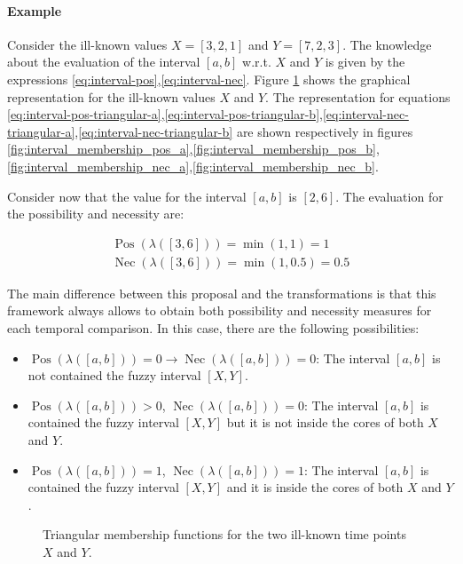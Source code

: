 \documentclass[twoside,twocolumn,a4paper]{article}
\newcommand{\Pos}{\operatorname{Pos}}
\newcommand{\Nec}{\operatorname{Nec}}
\begin{document}
\paragraph{Example} Consider the ill-known values $X = \left[3, 2, 1\right]$ and $Y = \left[7, 2, 3 \right]$. The knowledge about the evaluation of the interval $\left[a, b \right]$ w.r.t. $X$ and $Y$ is given by the expressions \eqref{eq:interval-pos},\eqref{eq:interval-nec}.  Figure \ref{fig:interval-rep} shows the graphical representation for the ill-known values $X$ and $Y$. The representation for equations \eqref{eq:interval-pos-triangular-a},\eqref{eq:interval-pos-triangular-b},\eqref{eq:interval-nec-triangular-a},\eqref{eq:interval-nec-triangular-b} are shown respectively in figures \ref{fig:interval_membership_pos_a},\ref{fig:interval_membership_pos_b},\ref{fig:interval_membership_nec_a},\ref{fig:interval_membership_nec_b}.

Consider now that the value for the interval $\left[a, b \right]$ is $\left[2, 6 \right]$. The evaluation for the possibility and necessity are:

\begin{eqnarray}
\label{eq:interval-pos}
\nonumber
\Pos\left(\lambda([3,6])\right)=\min(1,1)= 1\\
\label{eq:interval-nec}
\nonumber
\Nec\left(\lambda([3,6])\right)=\min(1,0.5 ) = 0.5
\end{eqnarray}

The main difference between this proposal and the transformations is that this framework always allows to obtain both possibility and necessity measures for each temporal comparison. In this case, there are the following possibilities:

\begin{itemize}
\item
$\Pos(\lambda([a,b])) = 0 \rightarrow \Nec(\lambda([a,b])) = 0$: The interval $[a,b]$ is not contained the fuzzy interval $[X,Y]$.
\item
$\Pos(\lambda([a,b])) > 0 $, $\Nec(\lambda([a,b])) = 0$: The interval $[a,b]$ is contained the fuzzy interval $[X,Y]$ but it is not inside the cores of both $X$ and $Y$.
\item
$\Pos(\lambda([a,b])) = 1 $, $\Nec(\lambda([a,b])) = 1$: The interval $[a,b]$ is contained the fuzzy interval $[X,Y]$ and it is inside the cores of both $X$ and $Y$.
\end{itemize}

\begin{figure}[h!]
\centering

\caption{Triangular membership functions for the two ill-known time points $X$ and $Y$.}
\label{fig:interval-rep}
\end{figure}
\end{document}
